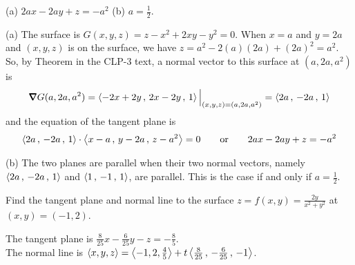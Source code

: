 %

\begin{answer}
(a) $2ax -2ay +z = -a^2$\qquad
(b) $a=\frac{1}{2}$.
\end{answer}

\begin{solution}
(a)
The surface is $G(x,y,z)=z-x^2+2xy-y^2=0$. When $x=a$ and $y=2a$
 and $(x,y,z)$ is on the surface, we have $z= a^2-2(a)(2a) +(2a)^2=a^2$.
So, by Theorem  in the CLP-3 text, 
a normal vector to this surface at $(a,2a,a^2)$ is
\begin{align*}
\vnabla G(a,2a,a^2) = \llt -2x+2y\,,\,2x-2y\,,\,1\rgt\Big|_{(x,y,z)=(a,2a,a^2)}
                    = \llt 2a\,,\,-2a\,,\,1\rgt
\end{align*}
and the equation of the tangent plane is 
\begin{align*}
\left< 2a\,,\,-2a\,,\,1\right>\cdot\left< x-a\,,\,y-2a\,,\,z-a^2\right> =0
\qquad\text{or}\qquad
2ax -2ay +z = -a^2
\end{align*}

(b) The two planes are parallel when their two normal vectors,
namely $\left< 2a\,,\,-2a\,,\,1\right>$ and $\left< 1\,,\,-1\,,\,1\right>$,
are parallel. This is the case if and only if $a=\frac{1}{2}$.
\end{solution}

\begin{question}[M200 2010D] %
Find the tangent plane and normal line to the surface 
$z=f(x,y)=\frac{2y}{x^2+y^2}$ at $(x,y)=(-1,2)$.
\end{question}

%

\begin{answer}
The tangent plane is $\frac{8}{25}x-\frac{6}{25}y-z=-\frac{8}{5}$.\\ 
  \null\hskip0.3in   The normal line is 
   $\left< x,y,z\right> = \left< -1,2,\frac{4}{5}\right> 
                  +t \left< \frac{8}{25}\,,\,-\frac{6}{25}\,,\,-1\right>$.
\end{answer}

